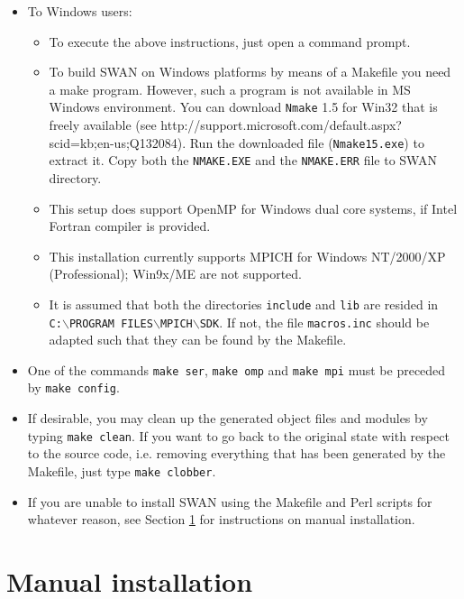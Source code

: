 \documentclass[12pt]{book}
\begin{document}
\begin{itemize}
  \item To Windows users:
        \begin{itemize}
           \item To execute the above instructions, just open a command prompt.
           \item To build SWAN on Windows platforms by means of a Makefile you need a make program.
                 However, such a program is not available in MS Windows environment. You can download
                 {\tt Nmake} 1.5 for Win32 that is freely available
                 (see http://support.microsoft.com/default.aspx?scid=kb;en-us;Q132084). Run the
                 downloaded file ({\tt Nmake15.exe}) to extract it. Copy both the {\tt NMAKE.EXE} and
                 the {\tt NMAKE.ERR} file to SWAN directory.
           \item This setup does support OpenMP for Windows dual core systems, if Intel Fortran
                 compiler is provided.
           \item This installation currently supports MPICH for
                 Windows NT/2000/XP (Professional); Win9x/ME are not supported.
           \item It is assumed that both the directories {\tt include} and
                 {\tt lib} are resided in\\
                 {\tt C:$\backslash$PROGRAM FILES$\backslash$MPICH$\backslash$SDK}.
                 If not, the file {\tt macros.inc} should be adapted such
                 that they can be found by the Makefile.
        \end{itemize}
  \item One of the commands {\tt make ser}, {\tt make omp} and {\tt make mpi}
        must be preceded by {\tt make config}.
  \item If desirable, you may clean up the generated object files and modules by
        typing {\tt make~clean}. If you want to go back to the original state
        with respect to the source code, i.e. removing everything that has been
        generated by the Makefile, just type {\tt make~clobber}.
  \item If you are unable to install SWAN using the Makefile and Perl scripts for
        whatever reason, see Section \ref{sec:manual} for instructions on manual
        installation.
\end{itemize}

\section{Manual installation} \label{sec:manual}
\end{document}
